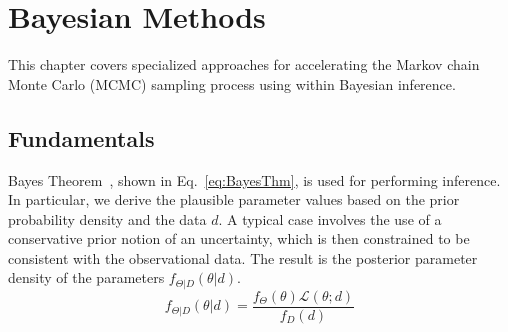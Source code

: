 \chapter{Bayesian Methods}\label{uq:bayes}


This chapter covers specialized approaches for accelerating the 
Markov chain Monte Carlo (MCMC) sampling process using within
Bayesian inference.

\section{Fundamentals} \label{uq:bayes:basic}

Bayes Theorem~\cite{Jaynes}, shown in Eq.~\ref{eq:BayesThm}, is used
for performing inference.  In particular, we derive the plausible
parameter values based on the prior probability density and the data
$d$. A typical case involves the use of a conservative prior notion of
an uncertainty, which is then constrained to be consistent with the
observational data.  The result is the posterior parameter density of
the parameters $f_{\Theta |D}\left( {\theta |d} \right)$.
\begin{equation}
{f_{\Theta |D}}\left( {\theta |d} \right) = \frac{{{f_\Theta }\left( \theta  \right)\mathcal{L}\left( {\theta ;d} \right)}}{{{f_D}\left( d \right)}} \label{eq:BayesThm}
\end{equation}

